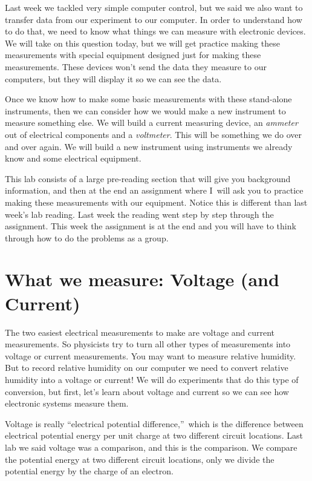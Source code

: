Last week we tackled very simple computer control, but we said we also want
to transfer data from our experiment to our computer. In order to understand
how to do that, we need to know what things we can measure with electronic
devices. We will take on this question today, but we will get practice
making these measurements with special equipment designed just for making
these measurements. These devices won't send the data they measure to our
computers, but they will display it so we can see the data.

Once we know how to make some basic measurements with these stand-alone
instruments, then we can consider how we would make a new instrument to
measure something else. We will build a current measuring device, an \emph{%
ammeter} out of electrical components and a \emph{voltmeter}. This will be
something we do over and over again. We will build a new instrument using
instruments we already know and some electrical equipment.

This lab consists of a large pre-reading section that will give you
background information, and then at the end an assignment where I\ will ask
you to practice making these measurements with our equipment. Notice this is
different than last week's lab reading. Last week the reading went step by
step through the assignment. This week the assignment is at the end and you
will have to think through how to do the problems as a group.

\section{What we measure: Voltage (and Current)\label{Voltage Measurement
with Meter}}

The two easiest electrical measurements to make are voltage and current
measurements. So physicists try to turn all other types of measurements into
voltage or current measurements. You may want to measure relative humidity.
But to record relative humidity on our computer we need to convert relative
humidity into a voltage or current! We will do experiments that do this type
of conversion, but first, let's learn about voltage and current so we can
see how electronic systems measure them.

Voltage is really \textquotedblleft electrical potential
difference,\textquotedblright\ which is the difference between electrical
potential energy per unit charge at two different circuit locations. Last
lab we said voltage was a comparison, and this is the comparison. We compare
the potential energy at two different circuit locations, only we divide the
potential energy by the charge of an electron.

